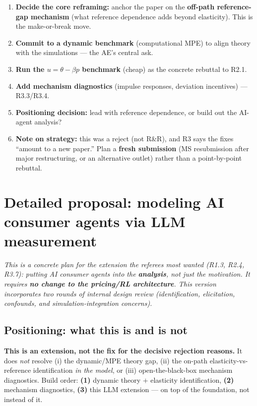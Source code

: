 \documentclass[11pt]{article}
\newcommand{\crit}[1]{\textcolor{crit}{\textbf{#1}}}
\begin{document}
\begin{enumerate}
  \item \crit{Decide the core reframing:} anchor the paper on the \textbf{off-path reference-gap
        mechanism} (what reference dependence adds beyond elasticity). This is the make-or-break move.
  \item \crit{Commit to a dynamic benchmark} (computational MPE) to align theory with the simulations
        --- the AE's central ask.
  \item \textbf{Run the $u=\theta-\beta p$ benchmark} (cheap) as the concrete rebuttal to R2.1.
  \item \textbf{Add mechanism diagnostics} (impulse responses, deviation incentives) --- R3.3/R3.4.
  \item \textbf{Positioning decision:} lead with reference dependence, or build out the AI-agent analysis?
  \item \textbf{Note on strategy:} this was a reject (not R\&R), and R3 says the fixes ``amount to a new
        paper.'' Plan a \textbf{fresh submission} (MS resubmission after major restructuring, or an
        alternative outlet) rather than a point-by-point rebuttal.
\end{enumerate}

\clearpage
\section{Detailed proposal: modeling AI consumer agents via LLM measurement}

\emph{This is a concrete plan for the extension the referees most wanted (R1.3, R2.4, R3.7): putting AI
consumer agents into the \textbf{analysis}, not just the motivation. It requires \textbf{no change to the
pricing/RL architecture}. This version incorporates two rounds of internal design review (identification,
elicitation, confounds, and simulation-integration concerns).}

\subsection*{Positioning: what this is and is not}

\crit{This is an extension, not the fix for the decisive rejection reasons.} It does \emph{not} resolve
(i) the dynamic/MPE theory gap, (ii) the on-path elasticity-vs-reference identification \emph{in the model},
or (iii) open-the-black-box mechanism diagnostics. Build order: \textbf{(1)} dynamic theory $+$ elasticity
identification, \textbf{(2)} mechanism diagnostics, \textbf{(3)} this LLM extension --- on top of the
foundation, not instead of it.
\end{document}
